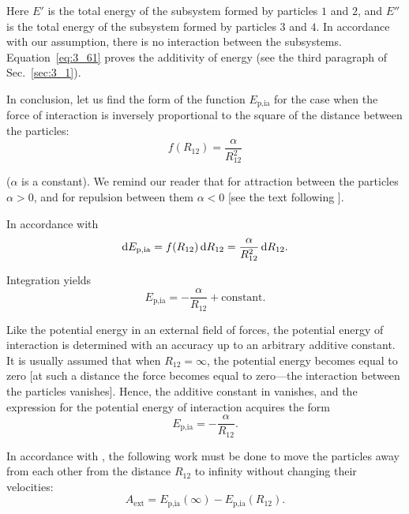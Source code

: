 \noindent
Here $E'$ is the total energy of the subsystem formed by particles $1$ and $2$, and $E''$ is the total energy of the subsystem formed by particles $3$ and $4$. In accordance with our assumption, there is no interaction between the subsystems. Equation~\eqref{eq:3_61} proves the additivity of energy (see the third paragraph of Sec.~\ref{sec:3_1}).

In conclusion, let us find the form of the function $E_{\text{p,ia}}$ for the case when the force of interaction is inversely proportional to the square of the distance between the particles:
\begin{equation}\label{eq:3_62}
f(R_{12}) = \frac{\alpha}{R_{12}^2}
\end{equation}

\noindent
($\alpha$ is a constant). We remind our reader that for attraction between the particles $\alpha>0$, and for repulsion between them $\alpha<0$ [see the text following ].

In accordance with 
\begin{equation*}
\mathrm{d} E_{\text{p,ia}} = f(R_{12})\,\mathrm{d} R_{12} = \frac{\alpha}{R_{12}^2}\,\mathrm{d} R_{12}.
\end{equation*}

\noindent
Integration yields
\begin{equation}\label{eq:3_63}
E_{\text{p,ia}} = - \frac{\alpha}{R_{12}} + \text{constant}.
\end{equation}

Like the potential energy in an external field of forces, the potential energy of interaction is determined with an accuracy up to an arbitrary additive constant. It is usually assumed that when $R_{12}=\infty$, the potential energy becomes equal to zero [at such a distance the force  becomes equal to zero---the interaction between the particles vanishes]. Hence, the additive constant in  vanishes, and the expression for the potential energy of interaction acquires the form
\begin{equation}\label{eq:3_64}
E_{\text{p,ia}} = - \frac{\alpha}{R_{12}}.
\end{equation}

In accordance with , the following work must be done to move the particles away from each other from the distance $R_{12}$ to infinity without changing their velocities:
\begin{equation*}
A_{\text{ext}} = E_{\text{p,ia}}(\infty) - E_{\text{p,ia}}(R_{12}).
\end{equation*}

